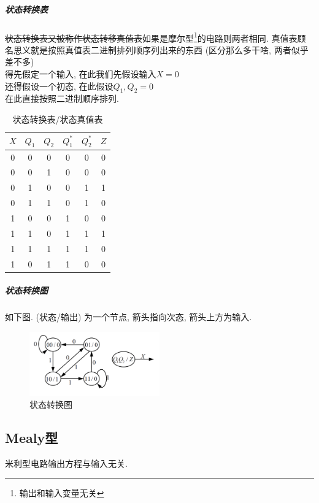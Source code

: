 \documentclass[scheme=chinese,a4paper]{report}
\begin{document}
\subparagraph{状态转换表}
\sout{状态转换表又被称作状态转移真值表}如果是摩尔型\footnote{输出和输入变量无关}的电路则两者相同. 真值表顾名思义就是按照真值表二进制排列顺序列出来的东西 (区分那么多干啥, 两者似乎差不多)\\
得先假定一个输入, 在此我们先假设输入$X=0$\\
还得假设一个初态, 在此假设$Q_1,Q_2=0$\\
在此直接按照二进制顺序排列. 
\begin{table}[htbp]
    \centering
    \caption{状态转换表/状态真值表}
      \begin{tabular}{c|cc|cc|c}
      $X$     & $Q_1$    & $Q_2$    & $Q_1^*$   & $Q_2^*$   & $Z$ \\
      \hline
      0     & 0     & 0     & 0     & 0     & 0 \\
      0     & 0     & 1     & 0     & 0     & 0 \\
      0     & 1     & 0     & 0     & 1     & 1 \\
      0     & 1     & 1     & 0     & 1     & 0 \\
      1     & 0     & 0     & 1     & 0     & 0 \\
      1     & 1     & 0     & 1     & 1     & 1 \\
      1     & 1     & 1     & 1     & 1     & 0 \\
      1     & 0     & 1     & 1     & 0     & 0 \\
      \end{tabular}%
  \end{table}%
\subparagraph{状态转换图}如下图. (状态/输出) 为一个节点, 箭头指向次态, 箭头上方为输入. 
\begin{figure}[H]
\centering
\includegraphics[width=0.5\textwidth]{sync_example_graph.png}
\caption{状态转换图}
\end{figure}
\subsection{Mealy型}
\label{eg:sync_2}
米利型电路输出方程与输入无关. 
\end{document}
